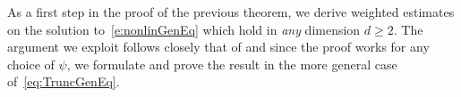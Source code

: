 \documentclass[reqno,11pt]{preprint}
\newcommand{\cA}{\mathcal{A}}
\newcommand{\cL}{\mathcal{L}}
\newcommand{\1}{\mathds{1}}
\newcommand{\gensy}{\cL_0}
\newcommand{\genap}{\cA^{\eps}_+}
\newcommand{\genam}{\cA^{\eps}_-}
\newcommand{\Op}{\mathcal{H}^\eps}
\begin{document}
%

As a first step in the proof of the previous theorem, we derive weighted estimates 
on the solution to~\eqref{e:nonlinGenEq} which hold in {\it any} dimension $d\geq 2$. 
The argument we exploit follows closely 
that of \cite[Lemma 2.5]{LandimYau1997} and since the proof works for any choice of $\psi$, 
we formulate and prove the result in the more 
general case of~\eqref{eq:TruncGenEq}. 
\end{document}
